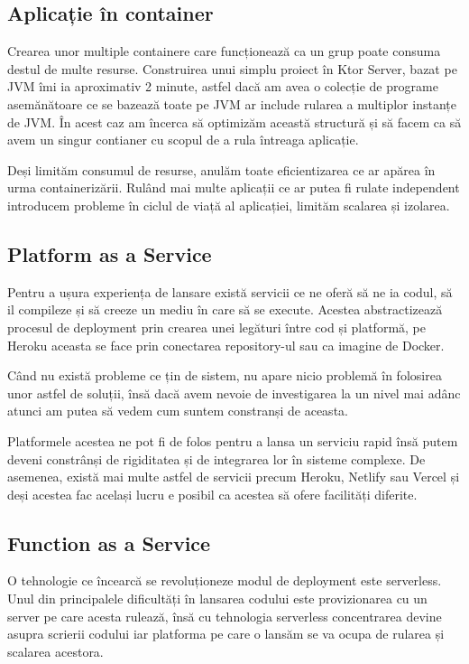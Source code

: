 \subsection{Aplicație în container}

Crearea unor multiple containere care funcționează ca un grup poate consuma destul de multe
resurse. Construirea unui simplu proiect în Ktor Server, bazat pe JVM îmi ia aproximativ 2 minute,
astfel dacă am avea o colecție de programe asemănătoare ce se bazează toate pe JVM ar include
rularea a multiplor instanțe de JVM. În acest caz am încerca să optimizăm această structură
și să facem ca să avem un singur contianer cu scopul de a rula întreaga aplicație.

Deși limităm consumul de resurse, anulăm toate eficientizarea ce ar apărea în urma
containerizării. Rulând mai multe aplicații ce ar putea fi rulate independent introducem
probleme în ciclul de viață al aplicației, limităm scalarea și izolarea.

\subsection{Platform as a Service}

Pentru a ușura experiența de lansare există servicii ce ne oferă să ne ia codul, să il
compileze și să creeze un mediu în care să se execute. Acestea abstractizează procesul de deployment
prin crearea unei legături între cod și platformă, pe Heroku aceasta se face prin conectarea
repository-ul sau ca imagine de Docker.

Când nu există probleme ce țin de sistem, nu apare nicio problemă în folosirea unor astfel
de soluții, însă dacă avem nevoie de investigarea la un nivel mai adânc atunci am putea
să vedem cum suntem constranși de aceasta.

Platformele acestea ne pot fi de folos pentru a lansa un serviciu rapid însă putem deveni
constrânși de rigiditatea și de integrarea lor în sisteme complexe. De asemenea, există
mai multe astfel de servicii precum Heroku, Netlify sau Vercel și deși acestea fac același
lucru e posibil ca acestea să ofere facilități diferite.

\subsection{Function as a Service}

O tehnologie ce încearcă se revoluționeze modul de deployment este serverless. Unul din principalele
dificultăți în lansarea codului este provizionarea cu un server pe care acesta rulează,
însă cu tehnologia serverless concentrarea devine asupra scrierii codului iar platforma
pe care o lansăm se va ocupa de rularea și scalarea acestora.

